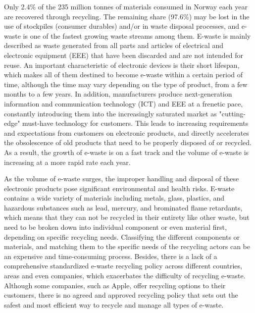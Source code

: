 \documentclass{article}
\numberwithin{equation}{section}
\begin{document}
Only 2.4\% of the 235 million tonnes of materials consumed in Norway each year are recovered through recycling. The remaining share (97.6\%) may be lost in the use of stockpiles (consumer durables) and/or in waste disposal processes, and e-waste is one of  the fastest growing waste streams among them. E-waste is mainly described as waste generated from all parts and articles of electrical and electronic equipment (EEE) that have been discarded and are not intended for reuse. An important characteristic of electronic devices is their short lifespan, which makes all of them destined to become e-waste within a certain period of time, although the time may vary depending on the type of product, from a few months to a few years. In addition, manufacturers produce next-generation information and communication technology (ICT) and EEE at a frenetic pace, constantly introducing them into the increasingly saturated market as "cutting-edge" must-have technology for customers. This leads to increasing requirements and expectations from customers on electronic products, and directly accelerates the obsolescence of old products that need to be properly disposed of or recycled. As a result, the growth of e-waste\cite{Forti20} is on a fast track and the volume of e-waste is increasing at a more rapid rate each year.

As the volume of e-waste surges, the improper handling and disposal \cite{Shaha22}of these electronic products pose significant environmental and health risks. E-waste contains a wide variety of materials including metals, glass, plastics, and hazardous substances such as lead, mercury, and brominated flame retardants, which means that they can not be recycled in their entirety like other waste, but need to be broken down into individual component or even material first, depending on specific recycling needs. Classifying the different components or materials, and matching them to the specific needs of the recycling actors can be an expensive and time-consuming process. Besides, there is a lack of a comprehensive standardized e-waste recycling policy\cite{why22} across different countries, areas and even companies, which exacerbates the difficulty of recycling e-waste. Although some companies, such as Apple, offer recycling options to their customers, there is no agreed and approved recycling policy that sets out the safest and most efficient way to recycle and manage all types of e-waste. 
\end{document}
